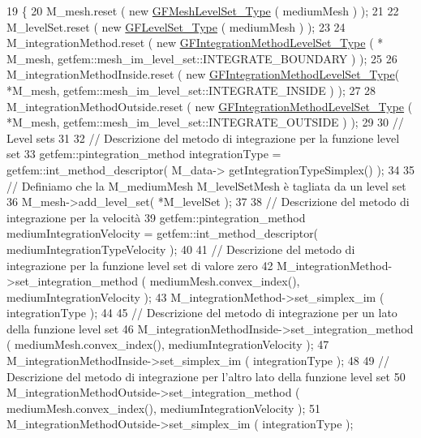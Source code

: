 \begin{DoxyCode}
19 \{
20     M\_mesh.reset ( \textcolor{keyword}{new} \hyperlink{Core_8h_a126f7165f04db4ed0b72454469145a08}{GFMeshLevelSet\_Type} ( mediumMesh ) );
21 
22     M\_levelSet.reset ( \textcolor{keyword}{new} \hyperlink{Core_8h_a71358a15bd3925629e26ccbb214a0133}{GFLevelSet\_Type} ( mediumMesh ) );
23 
24     M\_integrationMethod.reset ( \textcolor{keyword}{new} \hyperlink{Core_8h_ade18ba6e17965b6fdd50b3382b2a7020}{GFIntegrationMethodLevelSet\_Type} ( *
      M\_mesh, getfem::mesh\_im\_level\_set::INTEGRATE\_BOUNDARY ) );
25 
26     M\_integrationMethodInside.reset ( \textcolor{keyword}{new} \hyperlink{Core_8h_ade18ba6e17965b6fdd50b3382b2a7020}{GFIntegrationMethodLevelSet\_Type}(
       *M\_mesh, getfem::mesh\_im\_level\_set::INTEGRATE\_INSIDE ) );
27 
28     M\_integrationMethodOutside.reset ( \textcolor{keyword}{new} \hyperlink{Core_8h_ade18ba6e17965b6fdd50b3382b2a7020}{GFIntegrationMethodLevelSet\_Type}
       ( *M\_mesh, getfem::mesh\_im\_level\_set::INTEGRATE\_OUTSIDE ) );
29 
30     \textcolor{comment}{// Level sets}
31 
32     \textcolor{comment}{// Descrizione del metodo di integrazione per la funzione level set}
33     getfem::pintegration\_method integrationType = getfem::int\_method\_descriptor( M\_data->
      getIntegrationTypeSimplex() );
34 
35     \textcolor{comment}{// Definiamo che la M\_mediumMesh M\_levelSetMesh è tagliata da un level set}
36     M\_mesh->add\_level\_set( *M\_levelSet );
37 
38     \textcolor{comment}{// Descrizione del metodo di integrazione per la velocità}
39     getfem::pintegration\_method mediumIntegrationVelocity = getfem::int\_method\_descriptor( 
      mediumIntegrationTypeVelocity );
40 
41     \textcolor{comment}{// Descrizione del metodo di integrazione per la funzione level set di valore zero}
42     M\_integrationMethod->set\_integration\_method ( mediumMesh.convex\_index(), mediumIntegrationVelocity );
43     M\_integrationMethod->set\_simplex\_im ( integrationType );
44 
45     \textcolor{comment}{// Descrizione del metodo di integrazione per un lato della funzione level set}
46     M\_integrationMethodInside->set\_integration\_method ( mediumMesh.convex\_index(), 
      mediumIntegrationVelocity );
47     M\_integrationMethodInside->set\_simplex\_im ( integrationType );
48 
49     \textcolor{comment}{// Descrizione del metodo di integrazione per l'altro lato della funzione level set}
50     M\_integrationMethodOutside->set\_integration\_method ( mediumMesh.convex\_index(), 
      mediumIntegrationVelocity );
51     M\_integrationMethodOutside->set\_simplex\_im ( integrationType );

\end{DoxyCode}
